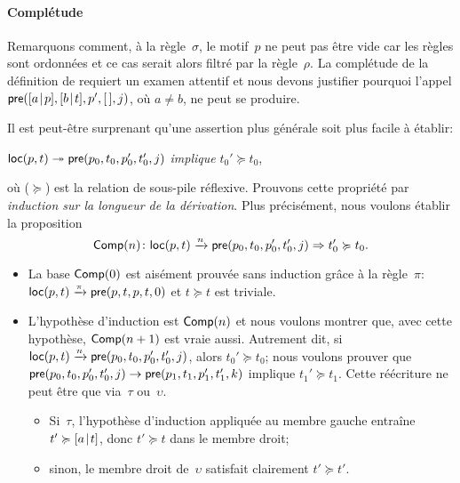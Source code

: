 \paragraph{Complétude}

Remarquons comment, à la règle~\(\sigma\), le motif~\(p\) ne peut pas
être vide car les règles sont ordonnées et ce cas serait alors filtré
par la règle~\(\rho\). La complétude de la définition de 
requiert un examen attentif et nous devons justifier pourquoi l'appel
\(\textsf{pre}([{a}\!\mid\!{p}],[{b}\!\mid\!{t}],p',[\,],j)\), où \(a \neq b\), ne
peut se produire.

Il est peut-être surprenant qu'une assertion plus générale soit plus
facile à établir:
\begin{center}
\(\textsf{loc}(p,t) \twoheadrightarrow \textsf{pre}(p_0,t_0,p_0',t_0',j)\)
\textsl{implique} \(t_0' \succcurlyeq t_0\),
\end{center}
où (\(\succcurlyeq\)) est la relation de sous-pile réflexive.
Prouvons cette propriété par \emph{induction sur la longueur de la
  dérivation}. Plus précisément, nous voulons établir la proposition
\begin{equation*}
\pred{Comp}{n} \colon \fun{loc}(p,t) \xrightarrow{\smash{n}}
\fun{pre}(p_0,t_0,p_0',t_0',j) \Rightarrow t_0' \succcurlyeq t_0.
\index{Comp@\predName{Comp}}
\end{equation*}
\begin{itemize}

  \item La base \(\textsf{Comp}({0})\) est aisément prouvée sans induction
  grâce à la règle~\(\pi\): \(\textsf{loc}(p,t) \xrightarrow{\smash{\pi}}
  \textsf{pre}(p,t,p,t,0)\) et \(t \succcurlyeq t\) est triviale.

  \item L'hypothèse d'induction est \(\textsf{Comp}({n})\) et nous voulons
    montrer que, avec cette hypothèse, \(\textsf{Comp}({n+1})\) est vraie
    aussi. Autrement dit, si \(\textsf{loc}(p,t) \xrightarrow{\smash{n}}
    \textsf{pre}(p_0,t_0,p_0',t_0',j)\), alors \(t_0' \succcurlyeq t_0\);
    nous voulons prouver que \(\textsf{pre}(p_0,t_0,p_0',t_0',j)
    \rightarrow \textsf{pre}(p_1,t_1,p_1',t_1',k)\) implique \(t_1'
    \succcurlyeq t_1\). Cette réécriture ne peut être que via~\(\tau\)
    ou~\(\upsilon\).
  \begin{itemize}

    \item Si~\(\tau\), l'hypothèse d'induction appliquée au membre
    gauche entraîne \(t' \succcurlyeq [{a}\!\mid\!{t}]\), donc \(t'
    \succcurlyeq t\) dans le membre droit;

    \item sinon, le membre droit de~\(\upsilon\) satisfait clairement
    \(t' \succcurlyeq t'\).

      \end{itemize}
\end{itemize}
